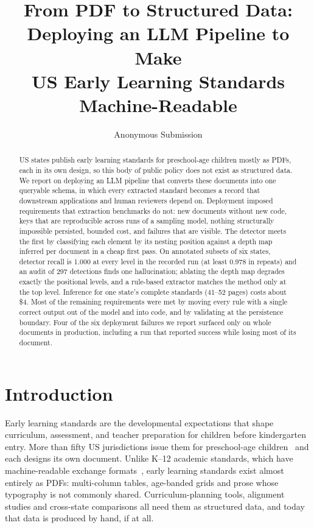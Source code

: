 \documentclass[letterpaper]{article} %
\title{From PDF to Structured Data: Deploying an LLM Pipeline to Make\\
US Early Learning Standards Machine-Readable}
\author{Anonymous Submission}
\begin{document}
\maketitle

\begin{abstract}
  US states publish early learning standards for preschool-age children mostly
  as PDFs, each in its own design, so this body of public policy does not exist
  as structured data. We report on deploying an LLM pipeline that converts these
  documents into one queryable schema, in which every extracted standard becomes
  a record that downstream applications and human reviewers depend on.
  Deployment imposed requirements that extraction benchmarks do not: new
  documents without new code, keys that are reproducible across runs of a
  sampling model, nothing structurally impossible persisted, bounded cost, and
  failures that are visible. The detector meets the first by classifying each
  element by its nesting position against a depth map inferred per document in a
  cheap first pass. On annotated subsets of six states, detector recall is 1.000
  at every level in the recorded run (at least 0.978 in repeats) and an audit of
  297 detections finds one hallucination; ablating the depth map degrades
  exactly the positional levels, and a rule-based extractor matches the method
  only at the top level. Inference for one state's complete standards
  (41--52 pages) costs about \$4. Most of the remaining requirements were met by moving
  every rule with a single correct output out of the model and into code, and by
  validating at the persistence boundary. Four of the six deployment failures we
  report surfaced only on whole documents in production, including a run that
  reported success while losing most of its document.
\end{abstract}

\section{Introduction}
\label{sec:introduction}

Early learning standards are the developmental expectations that shape
curriculum, assessment, and teacher preparation for children before
kindergarten entry. More than fifty US jurisdictions issue them for
preschool-age children~\citep{ncecqa_elgs} and each designs its own document.
Unlike K--12 academic standards, which have machine-readable exchange
formats~\citep{sutton2008achievement,1edtech2017case}, early learning standards
exist almost entirely as PDFs: multi-column tables, age-banded grids and prose
whose typography is not commonly shared. Curriculum-planning tools, alignment
studies and cross-state comparisons all need them as structured data, and
today that data is produced by hand, if at all.
\end{document}
